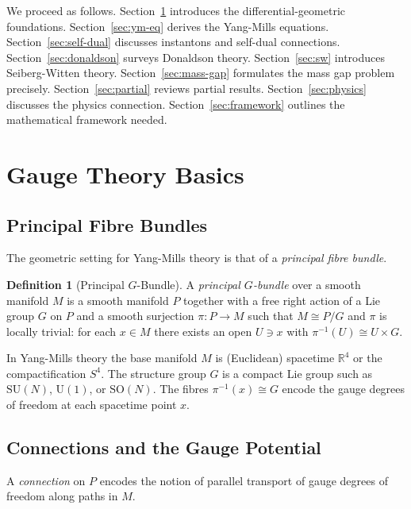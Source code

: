 \documentclass[12pt,a4paper]{amsart}
\theoremstyle{definition}
\newtheorem{definition}[theorem]{Definition}
\theoremstyle{remark}
\begin{document}
We proceed as follows. Section~\ref{sec:gauge} introduces the differential-geometric
foundations. Section~\ref{sec:ym-eq} derives the Yang-Mills equations.
Section~\ref{sec:self-dual} discusses instantons and self-dual connections.
Section~\ref{sec:donaldson} surveys Donaldson theory. Section~\ref{sec:sw} introduces
Seiberg-Witten theory. Section~\ref{sec:mass-gap} formulates the mass gap problem
precisely. Section~\ref{sec:partial} reviews partial results. Section~\ref{sec:physics}
discusses the physics connection. Section~\ref{sec:framework} outlines the mathematical
framework needed.

\section{Gauge Theory Basics}
\label{sec:gauge}

\subsection{Principal Fibre Bundles}

The geometric setting for Yang-Mills theory is that of a \emph{principal fibre bundle}.

\begin{definition}[Principal $G$-Bundle]
A \emph{principal $G$-bundle} over a smooth manifold $M$ is a smooth manifold $P$
together with a free right action of a Lie group $G$ on $P$ and a smooth surjection
$\pi: P \to M$ such that $M \cong P/G$ and $\pi$ is locally trivial: for each $x \in M$
there exists an open $U \ni x$ with $\pi^{-1}(U) \cong U \times G$.
\end{definition}

In Yang-Mills theory the base manifold $M$ is (Euclidean) spacetime $\mathbb{R}^4$ or
the compactification $S^4$. The structure group $G$ is a compact Lie group such as
$\mathrm{SU}(N)$, $\mathrm{U}(1)$, or $\mathrm{SO}(N)$. The fibres $\pi^{-1}(x) \cong G$
encode the gauge degrees of freedom at each spacetime point $x$.

\subsection{Connections and the Gauge Potential}

A \emph{connection} on $P$ encodes the notion of parallel transport of gauge degrees of
freedom along paths in $M$.
\end{document}
